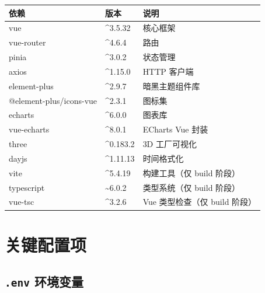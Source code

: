 \documentclass[UTF8,a4paper,11pt]{ctexart}
\begin{document}
\begin{longtable}{L{4.0cm} L{2.0cm} L{7.0cm}}
\toprule
\textbf{依赖} & \textbf{版本} & \textbf{说明} \\
\midrule
\endhead
vue                        & \^{}3.5.32   & 核心框架 \\
vue-router                 & \^{}4.6.4    & 路由 \\
pinia                      & \^{}3.0.2    & 状态管理 \\
axios                      & \^{}1.15.0   & HTTP 客户端 \\
element-plus               & \^{}2.9.7    & 暗黑主题组件库 \\
@element-plus/icons-vue    & \^{}2.3.1    & 图标集 \\
echarts                    & \^{}6.0.0    & 图表库 \\
vue-echarts                & \^{}8.0.1    & ECharts Vue 封装 \\
three                      & \^{}0.183.2  & 3D 工厂可视化 \\
dayjs                      & \^{}1.11.13  & 时间格式化 \\
vite                       & \^{}5.4.19   & 构建工具（仅 build 阶段） \\
typescript                 & \~{}6.0.2    & 类型系统（仅 build 阶段） \\
vue-tsc                    & \^{}3.2.6    & Vue 类型检查（仅 build 阶段） \\
\bottomrule
\end{longtable}

\section{关键配置项}

\subsection{\texttt{.env} 环境变量}
\end{document}
